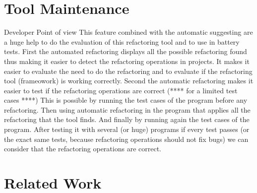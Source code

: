 
\section{Tool Maintenance}
Developer Point of view
This feature combined with the automatic suggesting are a huge help to do the
evaluation of this refactoring tool and to use in battery tests.
First the automated refactoring displays all the possible refactoring found thus making it easier
to detect the refactoring operations in projects.
It makes it easier to evaluate the need to do the refactoring and to evaluate
if the refactoring tool (frameowork) is working correctly.
Second the automatic refactoring makes it easier to test if the refactoring operations are correct (**** for a limited test cases ****)
This is possible by running the test cases of the program before any refactoring.
Then using automatic refactoring in the program that applies all the refactoring that the tool finds.
And finally by running again the test cases of the program.
After testing it with several (or huge) programs if every test passes (or the exact same tests, because refactoring operations should not fix bugs)
we can consider that the refactoring operations are correct.
\section{Related Work}
\label{sec:Related-Work}

